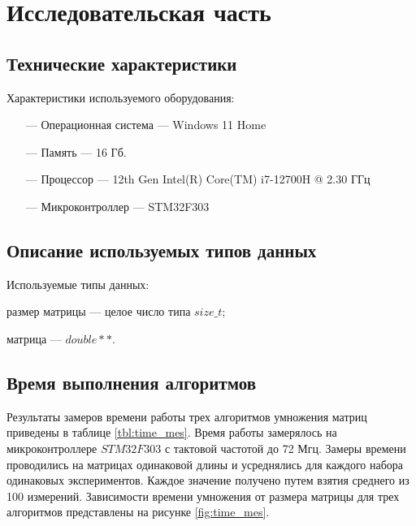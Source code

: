 \chapter{Исследовательская часть}

\section{Технические характеристики}
Характеристики используемого оборудования:
\begin{itemize}
    \item[---] Операционная система --- Windows 11 Home \cite{windows}
    \item[---] Память --- 16 Гб.
    \item[---] Процессор --- 12th Gen Intel(R) Core(TM) i7-12700H @  2.30 ГГц \cite{intel}
    \item[---] Микроконтроллер --- STM32F303 \cite{stm}
\end{itemize}

\section{Описание используемых типов данных}
Используемые типы данных:

размер матрицы --- целое число типа $size\_t$;

матрица --- $double **$.

\clearpage

\section{Время выполнения алгоритмов}
Результаты замеров времени работы трех алгоритмов умножения матриц приведены в таблице \ref{tbl:time_mes}. Время работы замерялось на микроконтроллере $STM32F303$ с тактовой частотой до 72 Мгц. Замеры времени проводились на матрицах одинаковой длины и усреднялись для каждого набора одинаковых экспериментов. Каждое значение получено путем взятия среднего из 100 измерений. Зависимости времени умножения от размера матрицы для трех алгоритмов представлены на рисунке \ref{fig:time_mes}.

